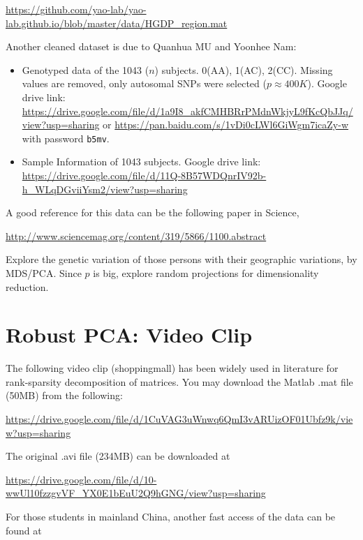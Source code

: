 \documentclass[11pt]{article}
\begin{document}
\url{https://github.com/yao-lab/yao-lab.github.io/blob/master/data/HGDP_region.mat}

Another cleaned dataset is due to Quanhua MU and Yoonhee Nam:  

\begin{itemize}
\item Genotyped data of the 1043 ($n$) subjects. 0(AA), 1(AC), 2(CC). Missing values are removed, only autosomal SNPs were selected ($p\approx 400K$). Google drive link: \\
\url{https://drive.google.com/file/d/1a9I8_akfCMHBRrPMdnWkjyL9fKcQbJJq/view?usp=sharing}
\noindent or 
\url{https://pan.baidu.com/s/1vDi0cLWl6GiWgm7icaZy-w} 
\noindent with password {\tt b5mv}.
\item Sample Information of 1043 subjects. Google drive link: \\
\url{https://drive.google.com/file/d/11Q-8B57WDQnrIV92b-h_WLqDGviiYsm2/view?usp=sharing} \\
\end{itemize}

A good reference for this data can be the following paper in Science, 

\url{http://www.sciencemag.org/content/319/5866/1100.abstract}

Explore the genetic variation of those persons with their geographic variations, by MDS/PCA. Since $p$ is big, explore random projections for dimensionality reduction.  


\section{Robust PCA: Video Clip}


The following video clip (shoppingmall) has been widely used in literature for rank-sparsity decomposition of matrices. You may download the Matlab .mat file (50MB) from the following:

\url{https://drive.google.com/file/d/1CuVAG3uWnwq6QmI3vARUizOF01Ubfz9k/view?usp=sharing}

\noindent The original .avi file (234MB) can be downloaded at 

\url{https://drive.google.com/file/d/10-wwUl10fzzgvVF_YX0E1bEuU2Q9hGNG/view?usp=sharing}

\noindent For those students in mainland China, another fast access of the data can be found at 
\end{document}
